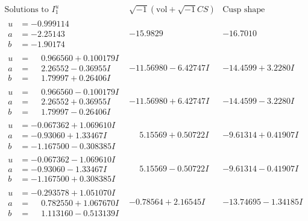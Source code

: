 \documentclass[1p]{elsarticle_modified}
\theoremstyle{definition}
\newcommand{\I}{\sqrt{-1}}
\begin{document}
$$\begin{array}{c|c|c}  
\text{Solutions to }I^u_{1}& \I (\text{vol} + \sqrt{-1}CS) & \text{Cusp shape}\\
 \hline 
\begin{aligned}
u &= -0.999114\phantom{ +0.000000I} \\
a &= -2.25143\phantom{ +0.000000I} \\
b &= -1.90174\phantom{ +0.000000I}\end{aligned}
 & -15.9829\phantom{ +0.000000I} & -16.7010\phantom{ +0.000000I} \\ \hline\begin{aligned}
u &= \phantom{-}0.966560 + 0.100179 I \\
a &= \phantom{-}2.26552 - 0.36955 I \\
b &= \phantom{-}1.79997 + 0.26406 I\end{aligned}
 & -11.56980 - 6.42747 I & -14.4599 + 3.2280 I \\ \hline\begin{aligned}
u &= \phantom{-}0.966560 - 0.100179 I \\
a &= \phantom{-}2.26552 + 0.36955 I \\
b &= \phantom{-}1.79997 - 0.26406 I\end{aligned}
 & -11.56980 + 6.42747 I & -14.4599 - 3.2280 I \\ \hline\begin{aligned}
u &= -0.067362 + 1.069610 I \\
a &= -0.93060 + 1.33467 I \\
b &= -1.167500 - 0.308385 I\end{aligned}
 & \phantom{-}5.15569 + 0.50722 I & -9.61314 + 0.41907 I \\ \hline\begin{aligned}
u &= -0.067362 - 1.069610 I \\
a &= -0.93060 - 1.33467 I \\
b &= -1.167500 + 0.308385 I\end{aligned}
 & \phantom{-}5.15569 - 0.50722 I & -9.61314 - 0.41907 I \\ \hline\begin{aligned}
u &= -0.293578 + 1.051070 I \\
a &= \phantom{-}0.782550 + 1.067670 I \\
b &= \phantom{-}1.113160 - 0.513139 I\end{aligned}
 & -0.78564 + 2.16545 I & -13.74695 - 1.34185 I \\ \hline\begin{aligned}

\end{aligned}
\end{array}$$
\end{document}

